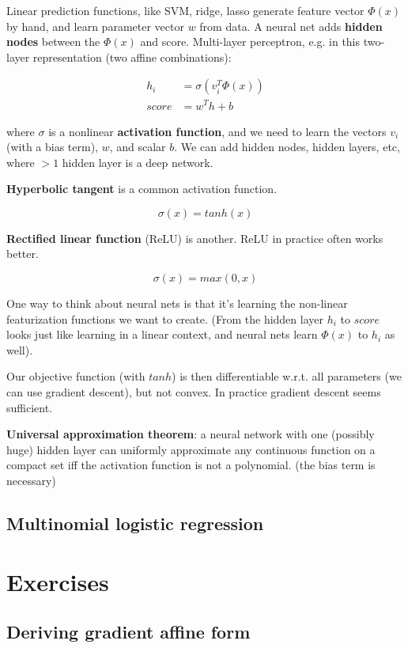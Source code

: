\documentclass{article}
\begin{document}
Linear prediction functions, like SVM, ridge, lasso generate feature vector $\Phi(x)$ by hand, and learn parameter vector $w$ from data.
A neural net adds \textbf{hidden nodes} between the $\Phi(x)$ and score.
Multi-layer perceptron, e.g. in this two-layer representation (two affine combinations):

\begin{align*}
h_i   &= \sigma(v_i^T \Phi(x)) \\
score &= w^T h + b
\end{align*}

where $\sigma$ is a nonlinear \textbf{activation function}, and we need to learn the vectors $v_i$ (with a bias term), $w$, and scalar $b$.
We can add hidden nodes, hidden layers, etc, where $>1$ hidden layer is a deep network.

\textbf{Hyperbolic tangent} is a common activation function.

$$
\sigma(x) = tanh(x)
$$

\textbf{Rectified linear function} (ReLU) is another. ReLU in practice often works better.

$$
\sigma(x) = max(0, x)
$$

One way to think about neural nets is that it's learning the non-linear featurization functions we want to create.
(From the hidden layer $h_i$ to $score$ looks just like learning in a linear context, and neural nets learn $\Phi(x)$ to $h_i$ as well).

Our objective function (with $tanh$) is then differentiable w.r.t. all parameters (we can use gradient descent), but not convex.
In practice gradient descent seems sufficient.

\textbf{Universal approximation theorem}: a neural network with one (possibly huge) hidden layer can uniformly approximate any continuous function on a compact set iff the activation function is not a polynomial. (the bias term is necessary)

\subsection{Multinomial logistic regression}




\section{Exercises}

\subsection{Deriving gradient affine form}
\end{document}
